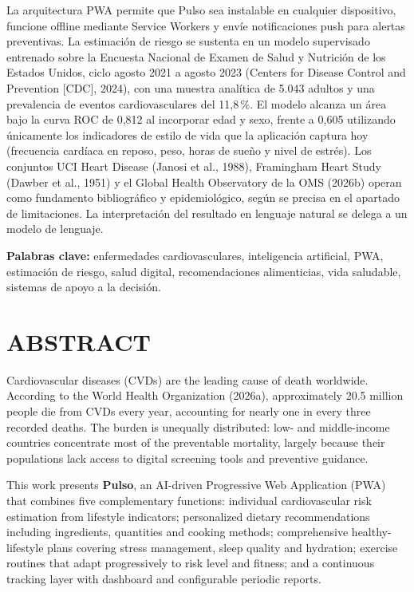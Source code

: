 \documentclass[12pt,letterpaper]{article}
\begin{document}
La arquitectura PWA permite que Pulso sea instalable en cualquier dispositivo,
funcione offline mediante Service Workers y envíe notificaciones push para
alertas preventivas. La estimación de riesgo se sustenta en un modelo supervisado
entrenado sobre la Encuesta Nacional de Examen de Salud y Nutrición de los
Estados Unidos, ciclo agosto 2021 a agosto 2023 (Centers for Disease Control and
Prevention [CDC], 2024), con una muestra analítica de 5.043 adultos y una
prevalencia de eventos cardiovasculares del 11,8\,\%. El modelo alcanza un área
bajo la curva ROC de 0,812 al incorporar edad y sexo, frente a 0,605 utilizando
únicamente los indicadores de estilo de vida que la aplicación captura hoy
(frecuencia cardíaca en reposo, peso, horas de sueño y nivel de estrés). Los
conjuntos UCI Heart Disease (Janosi et al., 1988), Framingham Heart Study (Dawber
et al., 1951) y el Global Health Observatory de la OMS (2026b) operan como
fundamento bibliográfico y epidemiológico, según se precisa en el apartado de
limitaciones. La interpretación del resultado en lenguaje natural se delega a un
modelo de lenguaje.

\vspace{0.4cm}
\noindent\textbf{Palabras clave:} enfermedades cardiovasculares, inteligencia
artificial, PWA, estimación de riesgo, salud digital, recomendaciones
alimenticias, vida saludable, sistemas de apoyo a la decisión.

\newpage

\section*{ABSTRACT}


Cardiovascular diseases (CVDs) are the leading cause of death worldwide.
According to the World Health Organization (2026a), approximately 20.5 million
people die from CVDs every year, accounting for nearly one in every three
recorded deaths. The burden is unequally distributed: low- and middle-income
countries concentrate most of the preventable mortality, largely because their
populations lack access to digital screening tools and preventive guidance.

This work presents \textbf{Pulso}, an AI-driven Progressive Web Application (PWA)
that combines five complementary functions: individual cardiovascular risk
estimation from lifestyle indicators; personalized dietary recommendations
including ingredients, quantities and cooking methods; comprehensive
healthy-lifestyle plans covering stress management, sleep quality and hydration;
exercise routines that adapt progressively to risk level and fitness; and a
continuous tracking layer with dashboard and configurable periodic reports.
\end{document}
